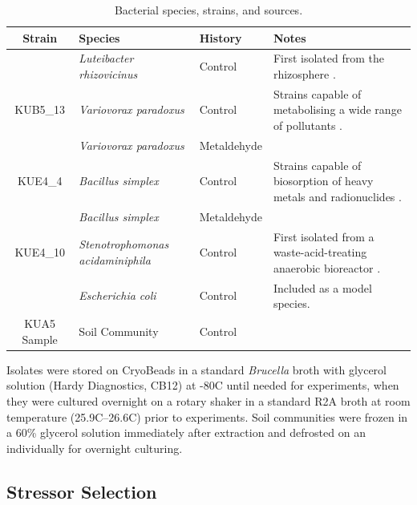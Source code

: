 \documentclass[final,1p,times]{elsarticle}
\begin{document}
\begin{table}[ht]
\begin{small}
\centering
\begin{tabular}{c p{3.1cm} l p{5.2cm}}
\toprule 
\textbf{{Strain}} & \textbf{{Species}} & \textbf{{History}} & \textbf{{Notes}} \\
\midrule
\rowcolor{black!20}{LUF4\_5} & \textit{Luteibacter rhizovicinus} & Control & First isolated from the rhizosphere \cite{Johansen2005LuteibacterL.}. \\
{KUB5\_13} & \textit{Variovorax paradoxus} & Control & Strains capable of metabolising a wide range of pollutants \cite{Satola2013MetabolicParadoxus}. \\
\rowcolor{black!20}{NUF1\_3} & \textit{Variovorax paradoxus} & Metaldehyde & \\
{KUE4\_4} & \textit{Bacillus simplex} & Control & Strains capable of biosorption of heavy metals and radionuclides \cite{Valentine1996BiosorptionZone}. \\
\rowcolor{black!20}{NUE1\_1} & \textit{Bacillus simplex} & Metaldehyde & \\
{KUE4\_10} & \textit{Stenotrophomonas \newline acidaminiphila} & Control & First isolated from a waste-acid-treating anaerobic bioreactor \cite{Assih2002}. \\
\rowcolor{black!20}{OP50} & \textit{Escherichia coli} & Control & Included as a model species. \\
{KUA5 Sample} & Soil Community & Control & \\
\bottomrule
\end{tabular}
\caption{Bacterial species, strains, and sources.}
\label{tab:isolates}
\end{small}
\end{table}

Isolates were stored on CryoBeads in a standard \textit{Brucella} broth with glycerol solution (Hardy Diagnostics, CB12) at -80\textdegree C until needed for experiments, when they were cultured overnight on a rotary shaker in a standard R2A broth at room temperature (25.9\textdegree C–26.6\textdegree C) prior to experiments. Soil communities were frozen in a 60\% glycerol solution immediately after extraction and defrosted on an individually for overnight culturing. 

\subsection{Stressor Selection}
\label{S:2:2}
\end{document}
